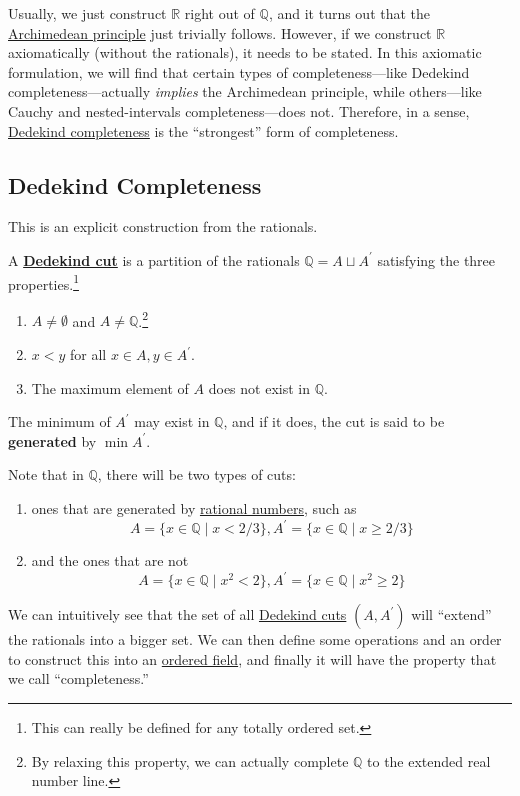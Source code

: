   Usually, we just construct $\mathbb{R}$ right out of $\mathbb{Q}$, and it turns out that the \hyperref[def:archimedean-principle]{Archimedean principle} just trivially follows. However, if we construct $\mathbb{R}$ axiomatically (without the rationals), it needs to be stated. In this axiomatic formulation, we will find that certain types of completeness---like Dedekind completeness---actually \textit{implies} the Archimedean principle, while others---like Cauchy and nested-intervals completeness---does not. Therefore, in a sense, \hyperref[alg-def:dedekind-completeness]{Dedekind completeness} is the ``strongest'' form of completeness. 

\subsection{Dedekind Completeness}  

  This is an explicit construction from the rationals. 

  \begin{definition}
    \label{def:dedekind-cut}
 
    A \textbf{\hyperref[def:dedekind-cut]{Dedekind cut}} is a partition of the rationals $\mathbb{Q} = A \sqcup A^\prime$ satisfying the three properties.\footnote{This can really be defined for any totally ordered set. } 
    \begin{enumerate}
      \item $A \neq \emptyset$ and $A \neq \mathbb{Q}$.\footnote{By relaxing this property, we can actually complete $\mathbb{Q}$ to the extended real number line. }
      \item $x < y$ for all $x \in A, y \in A^\prime$. 
      \item The maximum element of $A$ does not exist in $\mathbb{Q}$. 
    \end{enumerate}
    The minimum of $A^\prime$ may exist in $\mathbb{Q}$, and if it does, the cut is said to be \textbf{generated} by $\min A^\prime$. 
  \end{definition}

  Note that in $\mathbb{Q}$, there will be two types of cuts: 
  \begin{enumerate}
    \item ones that are generated by \hyperref[alg-def:rational-numbers]{rational numbers}, such as 
    \begin{equation}
      A = \{x \in \mathbb{Q} \mid x < 2/3 \}, A^\prime = \{ x \in \mathbb{Q} \mid x \geq 2/3 \} 
    \end{equation}
    \item and the ones that are not 
    \begin{equation}
      A = \{x \in \mathbb{Q} \mid x^2 < 2 \}, A^\prime = \{x \in \mathbb{Q} \mid x^2 \geq 2 \}
    \end{equation}
  \end{enumerate}
  We can intuitively see that the set of all \hyperref[def:dedekind-cut]{Dedekind cuts} $(A, A^\prime)$ will ``extend'' the rationals into a bigger set. We can then define some operations and an order to construct this into an \hyperref[alg-def:ordered-field]{ordered field}, and finally it will have the property that we call ``completeness.''


